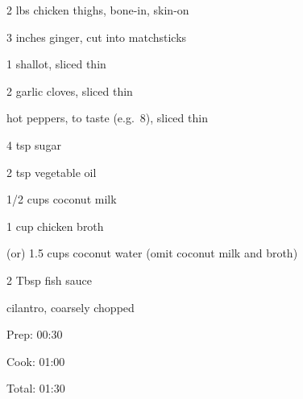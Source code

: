 \documentclass[oneside]{book}  %
\newcommand{\itemNL}{\item[] \hspace{-\labelsep}}  %
\begin{document}
\begin{IT}
  \begin{ingredients}
    \item[2 lbs] chicken thighs, bone-in, skin-on
    \item[3 inches] ginger, cut into matchsticks
    \item[1] shallot, sliced thin
    \item[2] garlic cloves, sliced thin
    \itemNL hot peppers, to taste (e.g.\ 8), sliced thin
    \item[4 tsp] sugar
    \item[2 tsp] vegetable oil
    \item[1/2 cups] coconut milk
    \item[1 cup] chicken broth
    \item[(or) 1.5 cups] coconut water (omit coconut milk and broth)
    \item[2 Tbsp] fish sauce
    \itemNL cilantro, coarsely chopped
  \end{ingredients}

  \switchcolumn

  \begin{timeline}
    \item[Prep:]  00:30
    \item[Cook:]  01:00
    \item[Total:] 01:30
  \end{timeline}
\end{IT}
\end{document}
